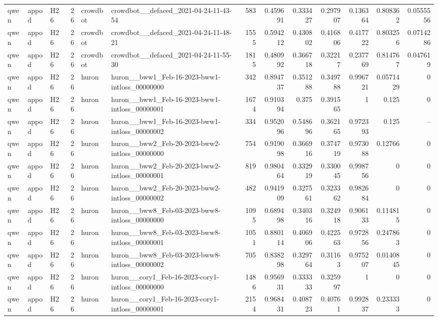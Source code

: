 \begin{longtable}{lllrllrrrrrrr}
qwen & appod & H26 & 26 & crowdbot & crowdbot\_\_defaced\_2021-04-24-11-43-54 & 583 & 0.459691 & 0.333427 & 0.297907 & 0.136364 & 0.808362 & 0.0555556 \\
qwen & appod & H26 & 26 & crowdbot & crowdbot\_\_defaced\_2021-04-24-11-48-21 & 1555 & 0.594212 & 0.430802 & 0.416806 & 0.417722 & 0.803256 & 0.0714286 \\
qwen & appod & H26 & 26 & crowdbot & crowdbot\_\_defaced\_2021-04-24-11-55-30 & 1815 & 0.480992 & 0.366718 & 0.32217 & 0.237769 & 0.814767 & 0.047619 \\
qwen & appod & H26 & 26 & huron & huron\_\_bww1\_Feb-16-2023-bww1-intloss\_00000000 & 342 & 0.894737 & 0.351288 & 0.349788 & 0.996721 & 0.0571429 & 0 \\
qwen & appod & H26 & 26 & huron & huron\_\_bww1\_Feb-16-2023-bww1-intloss\_00000001 & 1674 & 0.910394 & 0.375 & 0.391565 & 1 & 0.125 & 0 \\
qwen & appod & H26 & 26 & huron & huron\_\_bww1\_Feb-16-2023-bww1-intloss\_00000002 & 334 & 0.952096 & 0.548696 & 0.362165 & 0.972393 & 0.125 & -- \\
qwen & appod & H26 & 26 & huron & huron\_\_bww2\_Feb-20-2023-bww2-intloss\_00000000 & 754 & 0.919098 & 0.366916 & 0.374719 & 0.973088 & 0.12766 & 0 \\
qwen & appod & H26 & 26 & huron & huron\_\_bww2\_Feb-20-2023-bww2-intloss\_00000001 & 819 & 0.980464 & 0.332919 & 0.330045 & 0.998756 & 0 & 0 \\
qwen & appod & H26 & 26 & huron & huron\_\_bww2\_Feb-20-2023-bww2-intloss\_00000002 & 482 & 0.941909 & 0.327561 & 0.323362 & 0.982684 & 0 & 0 \\
qwen & appod & H26 & 26 & huron & huron\_\_bww8\_Feb-03-2023-bww8-intloss\_00000000 & 1095 & 0.689498 & 0.340316 & 0.324918 & 0.906133 & 0.114815 & 0 \\
qwen & appod & H26 & 26 & huron & huron\_\_bww8\_Feb-03-2023-bww8-intloss\_00000001 & 1051 & 0.880114 & 0.406906 & 0.422563 & 0.972856 & 0.247863 & 0 \\
qwen & appod & H26 & 26 & huron & huron\_\_bww8\_Feb-03-2023-bww8-intloss\_00000002 & 705 & 0.838298 & 0.329764 & 0.31163 & 0.975207 & 0.0140845 & 0 \\
qwen & appod & H26 & 26 & huron & huron\_\_cory1\_Feb-16-2023-cory1-intloss\_00000000 & 1486 & 0.956931 & 0.333333 & 0.325997 & 1 & 0 & 0 \\
qwen & appod & H26 & 26 & huron & huron\_\_cory1\_Feb-16-2023-cory1-intloss\_00000001 & 2154 & 0.968431 & 0.408723 & 0.40761 & 0.992837 & 0.233333 & 0 \\

\end{longtable}
